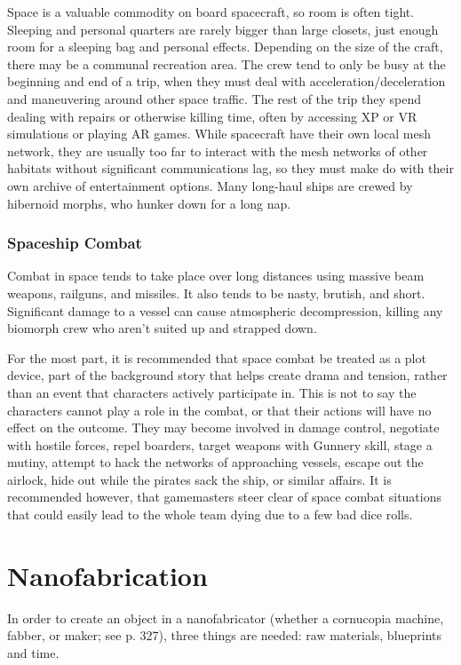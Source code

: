 Space is a valuable commodity on board spacecraft, so room is often tight. Sleeping and personal quarters are rarely bigger than large closets, just enough room for a sleeping bag and personal effects. Depending on the size of the craft, there may be a communal recreation area. The crew tend to only be busy at the beginning and end of a trip, when they must deal with acceleration/deceleration and maneuvering around other space traffic. The rest of the trip they spend dealing with repairs or otherwise killing time, often by accessing XP or VR simulations or playing AR games. While spacecraft have their own local mesh network, they are usually too far to interact with the mesh networks of other habitats without significant communications lag, so they must make do with their own archive of entertainment options. Many long-haul ships are crewed by hibernoid morphs, who hunker down for a long nap. 

\subsubsection{Spaceship Combat} 

Combat in space tends to take place over long distances using massive beam weapons, railguns, and missiles. It also tends to be nasty, brutish, and short. Significant damage to a vessel can cause atmospheric decompression, killing any biomorph crew who aren't suited up and strapped down. 

For the most part, it is recommended that space combat be treated as a plot device, part of the background story that helps create drama and tension, rather than an event that characters actively participate in. This is not to say the characters cannot play a role in the combat, or that their actions will have no effect on the outcome. They may become involved in damage control, negotiate with hostile forces, repel boarders, target weapons with Gunnery skill, stage a mutiny, attempt to hack the networks of approaching vessels, escape out the airlock, hide out while the pirates sack the ship, or similar affairs. It is recommended however, that gamemasters steer clear of space combat situations that could easily lead to the whole team dying due to a few bad dice rolls. 

\section{Nanofabrication} 

In order to create an object in a nanofabricator (whether a cornucopia machine, fabber, or maker; see p. 327), three things are needed: raw materials, blueprints and time. 

